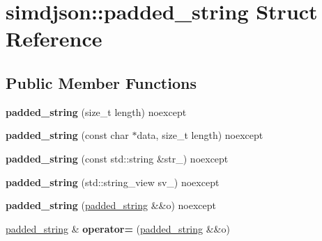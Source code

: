 \hypertarget{structsimdjson_1_1padded__string}{}\section{simdjson\+:\+:padded\+\_\+string Struct Reference}
\label{structsimdjson_1_1padded__string}
\subsection*{Public Member Functions}
\begin{DoxyCompactItemize}
\item 
\mbox{\label{structsimdjson_1_1padded__string_ac06ec74c78934565cdf50df163d35476}} 
{\bfseries padded\+\_\+string} (size\+\_\+t length) noexcept
\item 
\mbox{\label{structsimdjson_1_1padded__string_a1b15f9345c0215e7548df1aa0105de98}} 
{\bfseries padded\+\_\+string} (const char $\ast$data, size\+\_\+t length) noexcept
\item 
\mbox{\label{structsimdjson_1_1padded__string_a44fb0f219f05528e606f79dab7c32482}} 
{\bfseries padded\+\_\+string} (const std\+::string \&str\+\_\+) noexcept
\item 
\mbox{\label{structsimdjson_1_1padded__string_a6199f5bf259fcac114addeef569cf5a5}} 
{\bfseries padded\+\_\+string} (std\+::string\+\_\+view sv\+\_\+) noexcept
\item 
\mbox{\label{structsimdjson_1_1padded__string_a952eaf7ff8ddf252d9c00a693978a4da}} 
{\bfseries padded\+\_\+string} (\hyperlink{structsimdjson_1_1padded__string}{padded\+\_\+string} \&\&o) noexcept
\item 
\mbox{\label{structsimdjson_1_1padded__string_a84b0bcaa338d89a2bb0d44b8dfa48db6}} 
\hyperlink{structsimdjson_1_1padded__string}{padded\+\_\+string} \& {\bfseries operator=} (\hyperlink{structsimdjson_1_1padded__string}{padded\+\_\+string} \&\&o)
\item 
\mbox{\label{structsimdjson_1_1padded__string_a345beaab26aa96824e13d4294819dc9a}} 

\end{DoxyCompactItemize}
